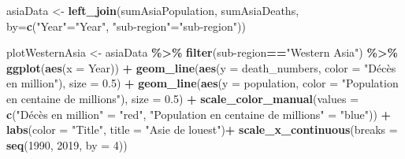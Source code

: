 \documentclass[
]{article}
\newenvironment{Shaded}{\begin{snugshade}}{\end{snugshade}}
\newcommand{\AttributeTok}[1]{\textcolor[rgb]{0.13,0.29,0.53}{#1}}
\newcommand{\DecValTok}[1]{\textcolor[rgb]{0.00,0.00,0.81}{#1}}
\newcommand{\FloatTok}[1]{\textcolor[rgb]{0.00,0.00,0.81}{#1}}
\newcommand{\FunctionTok}[1]{\textcolor[rgb]{0.13,0.29,0.53}{\textbf{#1}}}
\newcommand{\NormalTok}[1]{#1}
\newcommand{\OtherTok}[1]{\textcolor[rgb]{0.56,0.35,0.01}{#1}}
\newcommand{\SpecialCharTok}[1]{\textcolor[rgb]{0.81,0.36,0.00}{\textbf{#1}}}
\newcommand{\StringTok}[1]{\textcolor[rgb]{0.31,0.60,0.02}{#1}}
\begin{document}
\begin{Shaded}
\begin{Highlighting}[]
\NormalTok{asiaData }\OtherTok{\textless{}{-}} \FunctionTok{left\_join}\NormalTok{(sumAsiaPopulation, sumAsiaDeaths, }\AttributeTok{by=}\FunctionTok{c}\NormalTok{(}\StringTok{"Year"}\OtherTok{=}\StringTok{"Year"}\NormalTok{, }\StringTok{"sub{-}region"}\OtherTok{=}\StringTok{"sub{-}region"}\NormalTok{))}


\NormalTok{plotWesternAsia }\OtherTok{\textless{}{-}}\NormalTok{ asiaData }\SpecialCharTok{\%\textgreater{}\%}
  \FunctionTok{filter}\NormalTok{(}\StringTok{\textasciigrave{}}\AttributeTok{sub{-}region}\StringTok{\textasciigrave{}}\SpecialCharTok{==}\StringTok{"Western Asia"}\NormalTok{) }\SpecialCharTok{\%\textgreater{}\%}
  \FunctionTok{ggplot}\NormalTok{(}\FunctionTok{aes}\NormalTok{(}\AttributeTok{x =}\NormalTok{ Year)) }\SpecialCharTok{+} 
  \FunctionTok{geom\_line}\NormalTok{(}\FunctionTok{aes}\NormalTok{(}\AttributeTok{y =}\NormalTok{ death\_numbers, }\AttributeTok{color =} \StringTok{"Décès en million"}\NormalTok{), }\AttributeTok{size =} \FloatTok{0.5}\NormalTok{) }\SpecialCharTok{+}
  \FunctionTok{geom\_line}\NormalTok{(}\FunctionTok{aes}\NormalTok{(}\AttributeTok{y =}\NormalTok{ population, }\AttributeTok{color =} \StringTok{"Population en centaine de millions"}\NormalTok{), }\AttributeTok{size =} \FloatTok{0.5}\NormalTok{) }\SpecialCharTok{+}
  \FunctionTok{scale\_color\_manual}\NormalTok{(}\AttributeTok{values =} \FunctionTok{c}\NormalTok{(}\StringTok{"Décès en million"} \OtherTok{=} \StringTok{"red"}\NormalTok{, }\StringTok{"Population en centaine de millions"} \OtherTok{=} \StringTok{"blue"}\NormalTok{)) }\SpecialCharTok{+}
  \FunctionTok{labs}\NormalTok{(}\AttributeTok{color =} \StringTok{"Title"}\NormalTok{, }\AttributeTok{title =} \StringTok{"Asie de l\textquotesingle{}ouest"}\NormalTok{)}\SpecialCharTok{+}
  \FunctionTok{scale\_x\_continuous}\NormalTok{(}\AttributeTok{breaks =} \FunctionTok{seq}\NormalTok{(}\DecValTok{1990}\NormalTok{, }\DecValTok{2019}\NormalTok{, }\AttributeTok{by =} \DecValTok{4}\NormalTok{))}


\end{Highlighting}
\end{Shaded}
\end{document}

